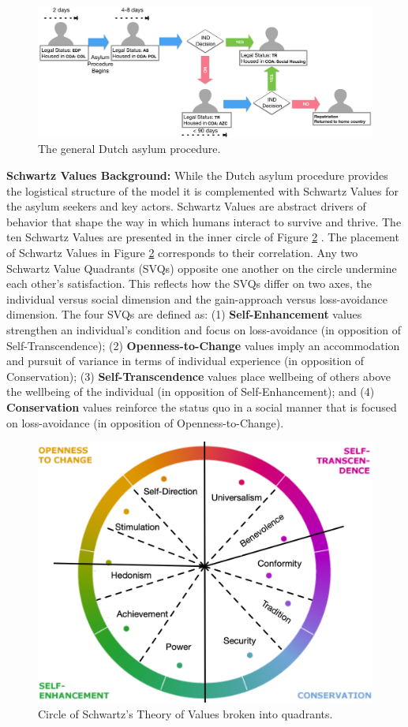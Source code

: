 \documentclass{scspaperproc}
\theoremstyle{scsthe}
\begin{document}
\begin{figure}[htb]
{
\centering
\includegraphics[width=0.70\columnwidth]{Asylum-Procedure.png}
\caption{The general Dutch asylum procedure.}
\label{fig:asy-proc}
}
\end{figure}

{\bf Schwartz Values Background:} While the Dutch asylum procedure provides the logistical structure of the model it is complemented with Schwartz Values for the asylum seekers and key actors. Schwartz Values are abstract drivers of behavior that shape the way in which humans interact to survive and thrive. The ten Schwartz Values are presented in the inner circle of Figure \ref{fig:val-circle} \cite{76}. The placement of Schwartz Values in Figure \ref{fig:val-circle} corresponds to their correlation. Any two Schwartz Value Quadrants (SVQs) opposite one another on the circle undermine each other's satisfaction. This reflects how the SVQs differ on two axes, the individual versus social dimension and the gain-approach versus loss-avoidance dimension. The four SVQs are defined as: (1) {\bf Self-Enhancement} values strengthen an individual's condition and focus on loss-avoidance (in opposition of Self-Transcendence); (2)  {\bf Openness-to-Change} values imply an accommodation and pursuit of variance in terms of individual experience (in opposition of Conservation); (3) {\bf Self-Transcendence} values place wellbeing of others above the wellbeing of the individual (in opposition of Self-Enhancement); and (4) {\bf Conservation} values reinforce the status quo in a social manner that is focused on loss-avoidance (in opposition of Openness-to-Change).

\begin{figure}[htb]
{
\centering
\includegraphics[width=0.4515\columnwidth]{Color-Value-Circle.png}
\caption{Circle of Schwartz's Theory of Values broken into quadrants.}
\label{fig:val-circle}
}
\end{figure}
\end{document}
